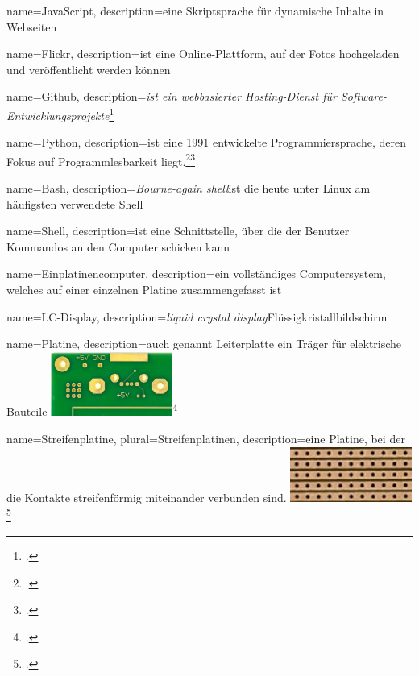 
{
  name=JavaScript,
  description={eine Skriptsprache für dynamische Inhalte in Webseiten}
}

{
  name=Flickr,
  description={ist eine Online-Plattform, auf der Fotos hochgeladen und veröffentlicht werden können}
}

{
  name=Github,
  description={\emph{ist ein webbasierter Hosting-Dienst für Software-Entwicklungsprojekte}\footcite{wiki:github}}
}

{
  name=Python,
  description={ist eine 1991 entwickelte Programmiersprache, deren Fokus auf Programmlesbarkeit liegt.\footcite{python}\footcite{python_manual}{}}
}

{
  name=Bash,
  description={\textit{Bourne-again shell}\newline ist die heute unter Linux am häufigsten verwendete \gls{Shell}}
}

{
  name=Shell,
  description={ist eine Schnittstelle, über die der Benutzer Kommandos an den Computer schicken kann}
}

{
  name=Einplatinencomputer,
  description={ein vollständiges Computersystem, welches auf einer einzelnen \gls{Platine} zusammengefasst ist}
}

{
  name=LC-Display,
  description={\emph{liquid crystal display}\newline Flüssigkristallbildschirm}
}

{
  name=Platine,
  description={auch genannt Leiterplatte\newline
  ein Träger für elektrische Bauteile\newline
  \includegraphics[width=4cm]{figures/platine.png}\footcite{platine}
    	}
}

{
  name=Streifenplatine,
  plural=Streifenplatinen,
  description={eine \gls{Platine}, bei der die Kontakte streifenförmig miteinander verbunden sind.\newline
  \includegraphics[width=4cm]{figures/streifenplatine.png}\footcite{streifenplatine}
  	}
}

